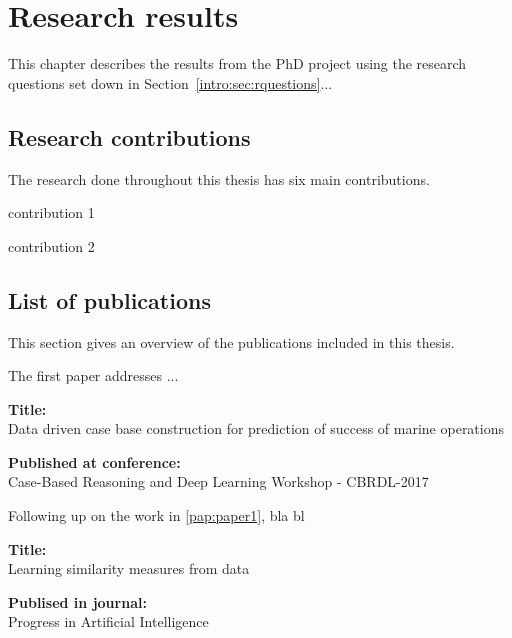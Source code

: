 \chapter{Research results}
\label{chap:summary}

This chapter describes the results from the PhD project using the
research questions set down in Section~\ref{intro:sec:rquestions}...
\lipsum[1-2]

\section{Research contributions}
\label{sec:contributions}
The research done throughout this thesis has six main contributions.
\lipsum[1-2]
\begin{description}[labelwidth=20pt, leftmargin=!]
\item[C1] contribution 1
\item[C2] contribution 2
\end{description}


\section{List of publications}
\label{summary:publist}
This section gives an overview of the publications included in this thesis. \lipsum[1-2]

The first paper addresses ...
\lipsum[1-2]
\begin{tcolorbox}[title=\cref{pap:paper1} (Mathisen 2016)]
  \label{papersum1}
  \textbf{Title:}\\
  \hspace*{6mm}Data driven case base construction for prediction of success
  \hspace*{6mm}of marine operations
  
  \textbf{Published at conference:}\\
    \hspace*{6mm}Case-Based Reasoning and Deep Learning Workshop -
    \hspace*{6mm}CBRDL-2017
\end{tcolorbox}
Following up on the work in \cref{pap:paper1}, bla bl
\lipsum[1-2]

\begin{tcolorbox}[title=\cref{pap:paper2} (Mathisen 2019)]
  \label{papersum2}
  \textbf{Title:}\\
  \hspace*{6mm}Learning similarity measures from data

  \textbf{Publised in journal:}\\
  \hspace*{6mm}Progress in Artificial Intelligence
\end{tcolorbox}

